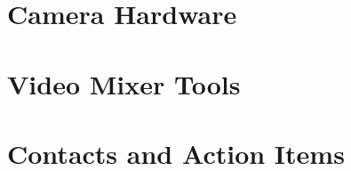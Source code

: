 \documentclass[aspectratio=169]{beamer}
\begin{document}




\section{Camera Hardware}





\section{Video Mixer Tools}



%
%


\section{Contacts and Action Items}
%




\end{document}
